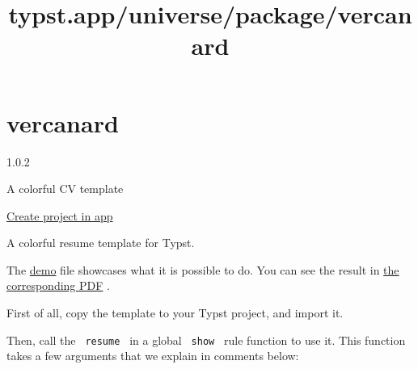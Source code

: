 \title{typst.app/universe/package/vercanard}

\label{banner}
\label{template-thumbnail}

\section{vercanard}\label{vercanard}

{ 1.0.2 }

A colorful CV template

\href{/app?template=vercanard&version=1.0.2}{Create project in app}

\label{readme}
A colorful resume template for Typst.

The
\href{https://github.com/typst/packages/raw/main/packages/preview/vercanard/1.0.2/template/main.typ}{demo}
file showcases what it is possible to do. You can see the result in
\href{https://github.com/typst/packages/raw/main/packages/preview/vercanard/1.0.2/demo.pdf}{the
corresponding PDF} .

First of all, copy the template to your Typst project, and import it.

\begin{Shaded}
\begin{Highlighting}[]
\end{Highlighting}
\end{Shaded}

Then, call the \texttt{\ resume\ } in a global \texttt{\ show\ } rule
function to use it. This function takes a few arguments that we explain
in comments below:

\begin{Shaded}
\begin{Highlighting}[]
\NormalTok{  aside: [}

\NormalTok{  ]}
\NormalTok{)}

\end{Highlighting}
\end{Shaded}

